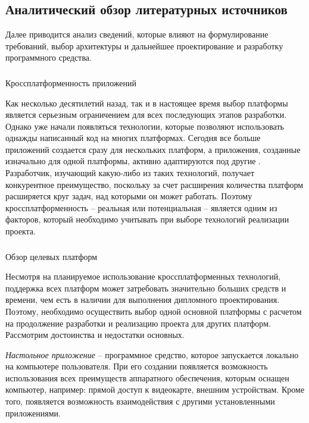 \subsection{Аналитический обзор литературных источников}
\label{sec:analysis:literature}

Далее приводится анализ сведений, которые влияют на формулирование требований, выбор архитектуры и дальнейшее 
проектирование и разработку программного средства.

\subsubsection{} Кроссплатформенность приложений
\label{sec:analysis:literature:crossplatform}

Как несколько десятилетий назад, так и в настоящее время выбор платформы является серьезным ограничением для всех
последующих этапов разработки. Однако уже начали появляться технологии, которые позволяют использовать однажды
написанный код на многих платформах. Сегодня все больше приложений создается сразу для нескольких платформ, а
приложения, созданные изначально для одной платформы, активно адаптируются под другие \cite{habr_crossplatform}.
Разработчик, изучающий какую-либо из таких технологий, получает конкурентное преимущество, поскольку за счет расширения
количества платформ расширяется круг задач, над которыми он может работать. Поэтому кроссплатформенность – реальная или
потенциальная – является одним из факторов, который необходимо учитывать при выборе технологий реализации проекта.

\subsubsection{} Обзор целевых платформ
\label{sec:analysis:literature:platforms}

Несмотря на планируемое использование кроссплатформенных технологий, поддержка всех платформ может затребовать
значительно больших средств и времени, чем есть в наличии для выполнения дипломного проектирования. Поэтому, необходимо
осуществить выбор одной основной платформы с расчетом на продолжение разработки и реализацию проекта для других платформ.
Рассмотрим достоинства и недостатки основных.

\emph{Настольное приложение} -- программное средство, которое запускается локально на компьютере пользователя. При его
создании появляется возможность использования всех преимуществ аппаратного обеспечения, которым оснащен компьютер,
например: прямой доступ к видеокарте, внешним устройствам. Кроме того, появляется возможность взаимодействия с другими
установленными приложениями.

